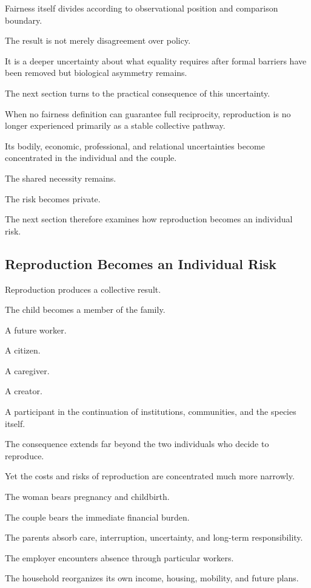 Fairness itself divides according to observational position and comparison boundary.

The result is not merely disagreement over policy.

It is a deeper uncertainty about what equality requires after formal barriers have been removed but biological asymmetry remains.

The next section turns to the practical consequence of this uncertainty.

When no fairness definition can guarantee full reciprocity, reproduction is no longer experienced primarily as a stable collective pathway.

Its bodily, economic, professional, and relational uncertainties become concentrated in the individual and the couple.

The shared necessity remains.

The risk becomes private.

The next section therefore examines how reproduction becomes an individual risk.

\subsection*{\textbf{Reproduction Becomes an Individual Risk}} 


Reproduction produces a collective result.

The child becomes a member of the family.

A future worker.

A citizen.

A caregiver.

A creator.

A participant in the continuation of institutions, communities, and the species itself.

The consequence extends far beyond the two individuals who decide to reproduce.

Yet the costs and risks of reproduction are concentrated much more narrowly.

The woman bears pregnancy and childbirth.

The couple bears the immediate financial burden.

The parents absorb care, interruption, uncertainty, and long-term responsibility.

The employer encounters absence through particular workers.

The household reorganizes its own income, housing, mobility, and future plans.

